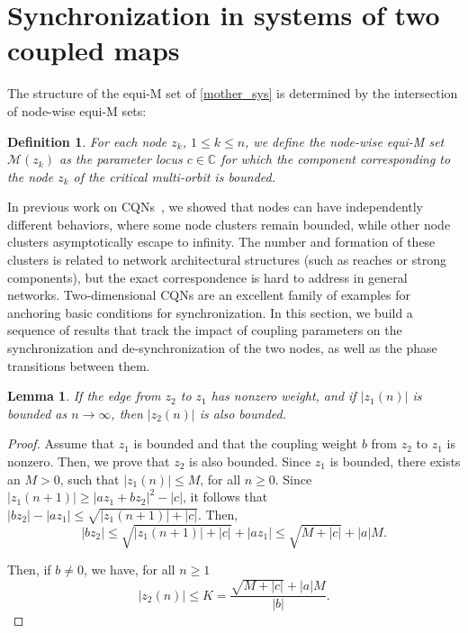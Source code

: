\documentclass[10pt]{article}
\newtheorem{lemma}[thm]{Lemma}
\newtheorem{defn}[thm]{Definition}
\begin{document}
\section{Synchronization in systems of two coupled maps}
\label{synchronization}

The structure of the equi-M set of \eqref{mother_sys} is determined by the intersection of node-wise equi-M sets:

\begin{defn}
For each node $z_k$, $1 \leq k \leq n$, we define the node-wise equi-M set $\mathcal{M}(z_k)$ as the parameter locus $c \in \mathbb{C}$ for which the component corresponding to the node $z_k$ of the critical multi-orbit is bounded.
\end{defn}

In previous work on CQNs~\cite{Ariel,AC2}, we showed that nodes can have independently different behaviors, where some node clusters remain bounded, while other node clusters asymptotically escape to infinity. The number and formation of these clusters is related to network architectural structures (such as reaches or strong components), but the exact correspondence is hard to address in general networks. Two-dimensional CQNs are an excellent family of examples for anchoring basic conditions for synchronization. In this section, we build a sequence of results that track the impact of coupling parameters on the synchronization and de-synchronization of the two nodes, as well as the phase transitions between them.

\begin{lemma} \label{basic_lemma}
If the edge from $z_2$ to $z_1$ has nonzero weight, and if $\lvert z_1(n) \rvert$ is bounded as $n \to \infty$, then $\lvert z_2(n) \rvert$ is also bounded.
\end{lemma}

\begin{proof}
Assume that $z_1$ is bounded and that the coupling weight $b$ from $z_2$ to $z_1$ is nonzero. Then, we prove that $z_2$ is also bounded. Since $z_1$ is bounded, there exists an $ M > 0$, such that $|z_1(n)| \leq M$, for all $n \geq 0$. Since $|z_1(n + 1) | \geq |a z_1 + b z_2|^2 - |c|$, it follows that $|b z_2| - |a z_1| \leq \sqrt{|z_1(n + 1)| + |c|}$. Then,
\[
|b z_2 | \leq \sqrt{|z_1(n + 1)| + |c|} + |a z_1| \leq \sqrt{M + |c|} + |a| M.
\]

Then, if $b \neq 0$, we have, for all $n \geq 1$
\[
|z_2(n)| \leq K = \frac{\sqrt{M + |c|} + |a | M}{|b|}.
\]
\end{proof}
\end{document}
